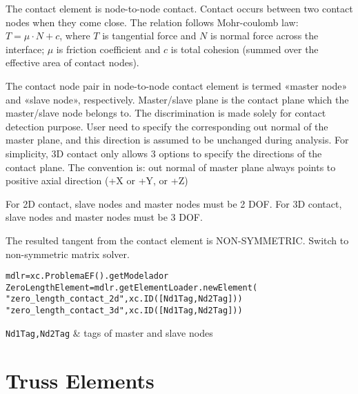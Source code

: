 The contact element is node-to-node contact. Contact occurs between two contact nodes when they come close. The relation follows Mohr-coulomb law: $T = \mu \cdot N + c$, where $T$ is tangential force and $N$ is normal force across the interface; $\mu$ is friction coefficient and $c$ is total cohesion (summed over the effective area of contact nodes).

The contact node pair in node-to-node contact element is termed «master node» and «slave node», respectively. Master/slave plane is the contact plane which the master/slave node belongs to. The discrimination is made solely for contact detection purpose. User need to specify the corresponding out normal of the master plane, and this direction is assumed to be unchanged during analysis. For simplicity, 3D contact only allows 3 options to specify the directions of the contact plane. The convention is: out normal of master plane always points to positive axial direction (+X or +Y, or +Z)

For 2D contact, slave nodes and master nodes must be 2 DOF. For 3D contact, slave nodes and master nodes must be 3 DOF.

The resulted tangent from the contact element is NON-SYMMETRIC. Switch to non-symmetric matrix solver. 

\begin{verbatim}
mdlr=xc.ProblemaEF().getModelador
ZeroLengthElement=mdlr.getElementLoader.newElement(
"zero_length_contact_2d",xc.ID([Nd1Tag,Nd2Tag]))
"zero_length_contact_3d",xc.ID([Nd1Tag,Nd2Tag]))
\end{verbatim}
\begin{paramFuncTable}
{\tt Nd1Tag,Nd2Tag} & tags of master and slave nodes\\
\end{paramFuncTable}


\begin{paramClassTable}
\ElementParam{}
\ElementZERODParam{}
\end{paramClassTable}

\begin{methodsTable}
\ElementMeth{}
\ElementZERODMeth{}
\end{methodsTable}



\section{Truss Elements}


